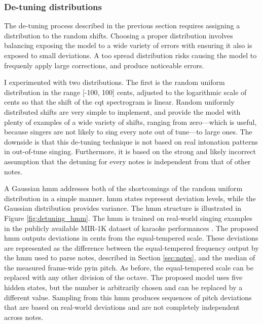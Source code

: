 \subsubsection{De-tuning distributions}
The de-tuning process described in the previous section requires assigning a distribution to the random shifts. Choosing a proper distribution involves balancing exposing the model to a wide variety of errors with ensuring it also is exposed to small deviations. A too spread distribution risks causing the model to frequenly apply large corrections, and produce noticeable errors. 

I experimented with two distributions. The first is the random uniform distribution in the range [-100, 100] cents, adjusted to the logarithmic scale of cents so that the shift of the \gls{cqt} spectrogram is linear. Random uniformly distributed shifts are very simple to implement, and provide the model with plenty of examples of a wide variety of shifts, ranging from zero---which is useful, because singers are not likely to sing every note out of tune---to large ones. The downside is that this de-tuning technique is not based on real intonation patterns in out-of-tune singing. Furthermore, it is based on the strong and likely incorrect assumption that the detuning for every notes is independent from that of other notes.

A Gaussian \gls{hmm} addresses both of the shortcomings of the random uniform distribution in a simple manner. \gls{hmm} states represent deviation levels, while the Gaussian distribution provides variance. The \gls{hmm} structure is illustrated in Figure \ref{fig:detuning_hmm}. The \gls{hmm} is trained on real-world singing examples in the publicly available MIR-1K dataset of karaoke performances \cite{hsu2009improvement}. The proposed \gls{hmm} outputs deviations in cents from the equal-tempered scale. These deviations are represented as the difference between the equal-tempered frequency output by the \gls{hmm} used to parse notes, described in Section \ref{sec:notes}, and the median of the measured frame-wide \gls{pyin} pitch. As before, the equal-tempered scale can be replaced with any other division of the octave. The proposed model uses five hidden states, but the number is arbitrarily chosen and can be replaced by a different value.  Sampling from this \gls{hmm} produces sequences of pitch deviations that are based on real-world deviations and are not completely independent across notes.


